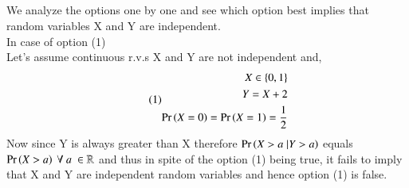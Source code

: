 \documentclass[journal,12pt,twocolumn]{IEEEtran}
\begin{document}
\subsection*{}
We analyze the options one by one and see which option best implies that random variables X and Y are independent. \\

In case of option (1)\\
Let's assume continuous r.v.s X and Y are not independent and, \\
\begin{align}\tag{1}
    \begin{split}
        X \in \{0, 1\}\\
        Y = X + 2\\
        \Pr\left(X=0\right) = \Pr\left(X=1\right) = \dfrac{1}{2}\\
    \end{split}
\end{align}
Now since Y is always greater than X therefore $\Pr\left(X>a \;| Y>a\right)$ equals $\Pr\left(X > a\right)\ \forall\ a\ \in \mathbb{R}$ and thus in spite of the option (1) being true, it fails to imply that X and Y are independent random variables and hence option (1) is false.\\
\end{document}
